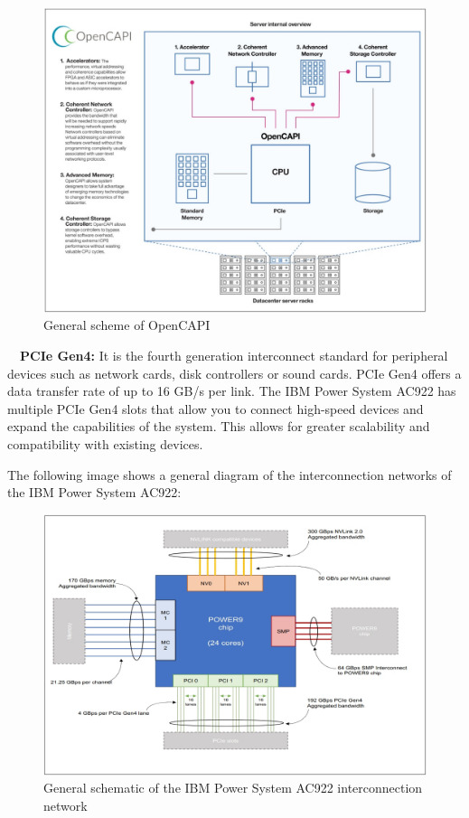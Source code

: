 \documentclass{report}
\begin{document}
\begin{figure}[H]
  \centering
  \includegraphics[scale=0.5]{img/opencapi.jpg}
  \caption{General scheme of OpenCAPI}
  \label{fig:General scheme of OpenCAPI}
\end{figure}

\setlength{\parindent}{1em}
\CIRCLE \ \ \textbf{PCIe Gen4:} It is the fourth generation interconnect standard for peripheral devices such as
network cards, disk controllers or sound cards. PCIe Gen4 offers a data transfer rate of up to 16 GB/s per link.
The IBM Power System AC922 has multiple PCIe Gen4 slots that allow you to connect high-speed devices and expand 
the capabilities of the system. This allows for greater scalability and compatibility with existing devices.

\cleardoublepage

\noindent The following image shows a general diagram of the interconnection networks of the IBM Power System AC922:

\begin{figure}[H]
  \centering
  \includegraphics[scale=0.5]{img/esquema_general.jpg}
  \caption{General schematic of the IBM Power System AC922 interconnection network}
  \label{fig:General schematic of the IBM Power System AC922 interconnection network}
\end{figure}
\end{document}
